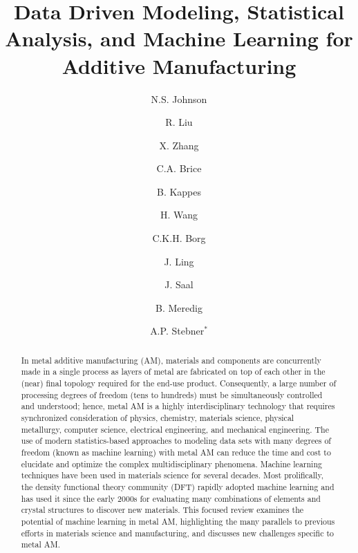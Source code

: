 \documentclass[twocolumn,superscriptaddress,nofootinbib]{revtex4-1}
\begin{document}
\title{Data Driven Modeling, Statistical Analysis, and Machine Learning for Additive Manufacturing}
\author{N.S. Johnson}
\author{R. Liu}
\author{X. Zhang}
\author{C.A. Brice}
\author{B. Kappes}

\author{H. Wang}

\author{C.K.H. Borg}
\author{J. Ling}
\author{J. Saal}
\author{B. Meredig}

\author{A.P. Stebner$^*$}


\begin{abstract}
In metal additive manufacturing (AM), materials and components are concurrently made in a single process as layers of metal are fabricated on top of each other in the (near) final topology required for the end-use product.
Consequently, a large number of processing degrees of freedom (tens to hundreds) must be simultaneously controlled and understood; hence, metal AM is a highly interdisciplinary technology that requires synchronized consideration of physics, chemistry, materials science, physical metallurgy, computer science, electrical engineering, and mechanical engineering.
The use of modern statistics-based approaches to modeling data sets with many degrees of freedom (known as machine learning) with metal AM can reduce the time and cost to elucidate and optimize the complex multidisciplinary phenomena.
Machine learning techniques have been used in materials science for several decades.
Most prolifically, the density functional theory community (DFT) rapidly adopted machine learning and has used it since the early 2000s for evaluating many combinations of elements and crystal structures to discover new materials.
This focused review examines the potential of machine learning in metal AM, highlighting the many parallels to previous efforts in materials science and manufacturing, and discusses new challenges specific to metal AM.
\end{abstract}

 
\maketitle
\tableofcontents









\end{document}
